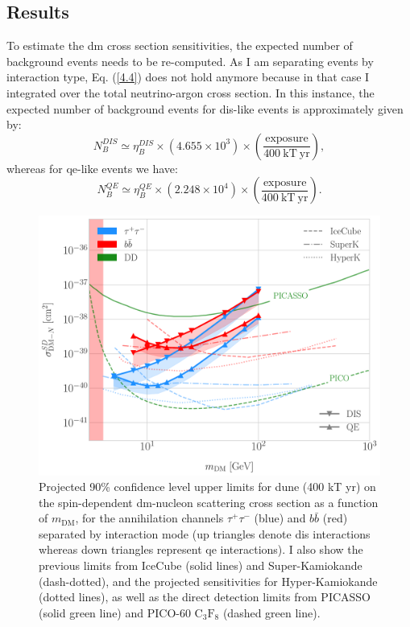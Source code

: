 \subsection{Results}

To estimate the \gls{dm} cross section sensitivities, the expected number of background events needs to be re-computed. As I am separating events by interaction type, Eq. (\ref{4.4}) does not hold anymore because in that case I integrated over the total neutrino-argon cross section. In this instance, the expected number of background events for \gls{dis}-like events is approximately given by:
\begin{equation}\label{6.11}
	N_{B}^{DIS} \simeq \eta_{B}^{DIS} \times \left(4.655 \times 10^{3}\right) \times \left(\frac{\mathrm{exposure}}{400 \ \mathrm{kT} \ \mathrm{yr}}\right),
\end{equation}
whereas for \gls{qe}-like events we have:
\begin{equation}\label{6.12}
	N_{B}^{QE} \simeq \eta_{B}^{QE} \times \left(2.248\times 10^{4}\right) \times \left(\frac{\mathrm{exposure}}{400 \ \mathrm{kT} \ \mathrm{yr}}\right).
\end{equation}

\begin{figure}[t]
	\centering
	\includegraphics[width=0.95\linewidth]{Images/DM_Analysis/solardm_xsection_sd.pdf}
	\caption[Projected 90\% confidence level upper limits for \gls{dune} on the spin-dependent \gls{dm}-nucleon scattering cross section as a function of $m_{\mathrm{DM}}$.]{Projected 90\% confidence level upper limits for \gls{dune} (400 kT yr) on the spin-dependent \gls{dm}-nucleon scattering cross section as a function of $m_{\mathrm{DM}}$, for the annihilation channels $\tau^{+}\tau^{-}$ (blue) and $b\bar{b}$ (red) separated by interaction mode (up triangles denote \gls{dis} interactions whereas down triangles represent \gls{qe} interactions). I also show the previous limits from IceCube \cite{IceCube2021} (solid lines) and Super-Kamiokande \cite{Super-Kamiokande2015} (dash-dotted), and the projected sensitivities for Hyper-Kamiokande \cite{Bell2021} (dotted lines), as well as the direct detection limits from PICASSO \cite{Behnke2016} (solid green line) and PICO-60 $\mathrm{C}_{3}\mathrm{F}_{8}$ \cite{PICO2019} (dashed green line).}
	\label{fig:solardm_xsection_sd}
\end{figure}


